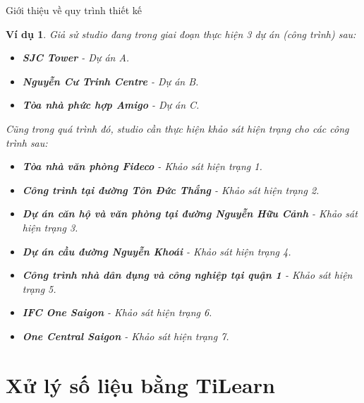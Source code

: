 \documentclass[10pt]{beamer}
\newtheorem{vd}{Ví dụ}[section]
\begin{document}
\begin{frame}{Giới thiệu về quy trình thiết kế}
\begin{vd}

Giả sử studio đang trong giai đoạn thực hiện 3 dự án (công trình) sau:

\begin{itemize} \footnotesize
\item \textbf{SJC Tower} - Dự án A.
\item \textbf{Nguyễn Cư Trinh Centre} - Dự án B.
\item \textbf{Tòa nhà phức hợp Amigo} - Dự án C.
\end{itemize}

Cũng trong quá trình đó, studio cần thực hiện khảo sát hiện trạng cho các công trình sau:
\begin{itemize} \footnotesize
\item \textbf{Tòa nhà văn phòng Fideco} - Khảo sát hiện trạng 1.
\item \textbf{Công trình tại đường Tôn Đức Thắng} - Khảo sát hiện trạng 2.
\item \textbf{Dự án căn hộ và văn phòng tại đường Nguyễn Hữu Cảnh} - Khảo sát hiện trạng 3.
\item \textbf{Dự án cầu đường Nguyễn Khoái} - Khảo sát hiện trạng 4.
\item \textbf{Công trình nhà dân dụng và công nghiệp tại quận 1} - Khảo sát hiện trạng 5.
\item \textbf{IFC One Saigon} - Khảo sát hiện trạng 6.
\item \textbf{One Central Saigon} - Khảo sát hiện trạng 7.
\end{itemize}
\end{vd}
\end{frame}

\section*{Xử lý số liệu bằng TiLearn}
\end{document}

